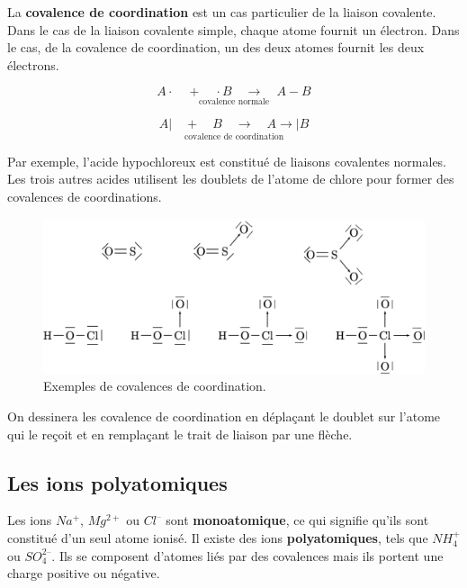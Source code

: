 \documentclass[
  11pt,
  a4paper,
  openany]{book}
\begin{document}
La \textbf{covalence de coordination} est un cas particulier de la liaison covalente. Dans le cas de la liaison covalente simple, chaque atome fournit un électron. Dans le cas, de la covalence de coordination, un des deux atomes fournit les deux électrons.

\[ \underset{\text{covalence normale}}{A \cdot \quad + \quad \cdot B \quad \longrightarrow \quad A - B} \]

\[ \underset{\text{covalence de coordination}}{A | \quad + \quad B \quad \longrightarrow \quad A \rightarrow | B} \]

Par exemple, l'acide hypochloreux est constitué de liaisons covalentes normales. Les trois autres acides utilisent les doublets de l'atome de chlore pour former des covalences de coordinations.

\begin{figure}

{\centering \includegraphics[width=0.85\linewidth]{images/covalences-coordination} 

}

\caption{Exemples de covalences de coordination.}\label{fig:covalences-coordination}
\end{figure}

On dessinera les covalence de coordination en déplaçant le doublet sur l'atome qui le reçoit et en remplaçant le trait de liaison par une flèche.

\subsection{Les ions polyatomiques}\label{les-ions-polyatomiques}

Les ions \(Na^+\), \(Mg^{2+}\) ou \(Cl^–\) sont \textbf{monoatomique}, ce qui signifie qu'ils sont constitué d'un seul atome ionisé. Il existe des ions \textbf{polyatomiques}, tels que \(NH_4^+\) ou \(SO_4^{2–}\). Ils se composent d'atomes liés par des covalences mais ils portent une charge positive ou négative.
\end{document}
